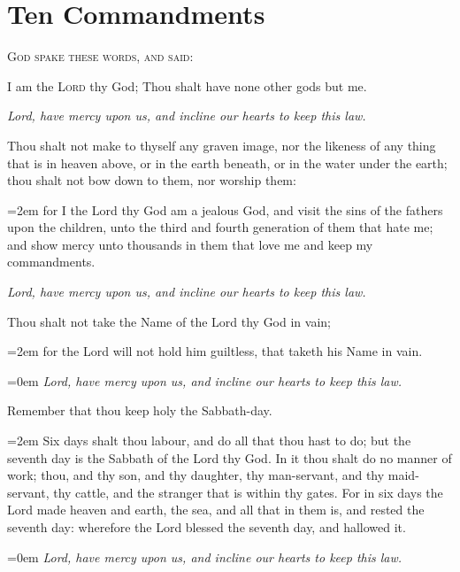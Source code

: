 \section*{Ten Commandments}
\begin{center}
	\textsc{God spake these words, and said:}
\end{center}
\par\noindent
    I am the \textsc{Lord} thy God; Thou shalt have none other gods but me.\par
    \textit{Lord, have mercy upon us, and incline our hearts to keep this law.}
    \par\noindent
    Thou shalt not make to thyself any graven image, nor the likeness of any thing that is in heaven above, or in the earth beneath, or in the water under the earth; thou shalt not bow down to them, nor worship them:
    \par\noindent
    \leftskip=2em
	{\small{for I the Lord thy God am a jealous God, and visit the sins of the fathers upon the children, unto the third and fourth generation of them that hate me; and show mercy unto thousands in them that love me and keep my commandments.}}
	\par
	\leftskip=0cm
    \textit{Lord, have mercy upon us, and incline our hearts to keep this law.}
    \par\noindent
    Thou shalt not take the Name of the Lord thy God in vain;
    \par\noindent
    \leftskip=2em
	{\small{for the Lord will not hold him guiltless, that taketh his Name in vain.}}
	\par
	\leftskip=0em
    \textit{Lord, have mercy upon us, and incline our hearts to keep this law.}
    \par\noindent
    Remember that thou keep holy the Sabbath-day.
    \par\noindent
    \leftskip=2em
	{\small{Six days shalt thou labour, and do all that thou hast to do; but the seventh day is the Sabbath of the Lord thy God. In it thou shalt do no manner of work; thou, and thy son, and thy daughter, thy man-servant, and thy maid-servant, thy cattle, and the stranger that is within thy gates. For in six days the Lord made heaven and earth, the sea, and all that in them is, and rested the seventh day: wherefore the Lord blessed the seventh day, and hallowed it.}}
	\par
	\leftskip=0em
    \textit{Lord, have mercy upon us, and incline our hearts to keep this law.}

